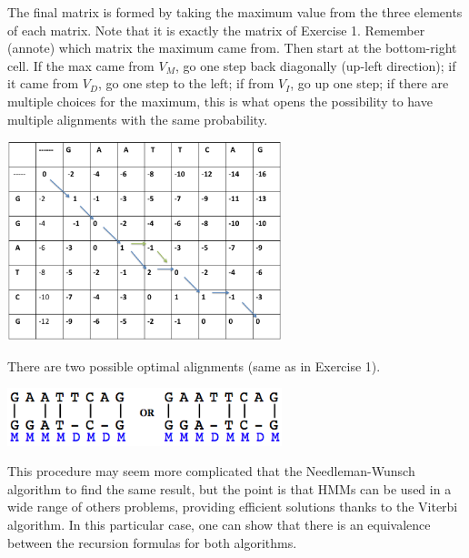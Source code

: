 \documentclass[english, a4paper,11pt]{article}
\begin{document}
The final matrix is formed by taking the maximum value from the three elements of each matrix. Note that it is exactly the matrix of Exercise 1.
Remember (annote) which matrix the maximum came from. Then start at the bottom-right cell. 
If the max came from $V_M$, go one step back diagonally (up-left direction); if it came from $V_D$, go one step to the left; if from $V_I$, go up one step; if there are multiple choices for the maximum, this is what opens the possibility to have multiple alignments with the same probability.

\begin{center}
\includegraphics[width=0.6\textwidth]{Slide4.eps}
\end{center}

There are two possible optimal alignments (same as in Exercise 1).

\begin{center}
\includegraphics[width=0.6\textwidth]{alignment2.png}
\end{center}

This procedure may seem more complicated that the Needleman-Wunsch algorithm to find the same result, but the point is that HMMs can be used in a wide range of others problems, providing efficient solutions thanks to the Viterbi algorithm. In this particular case, one can show that there is an equivalence between the recursion formulas for both algorithms.
\end{document}
